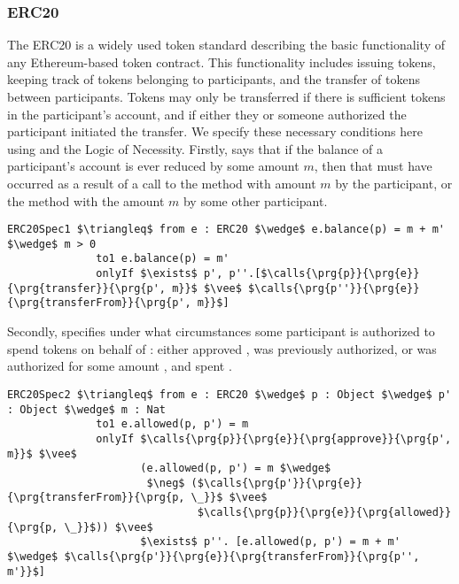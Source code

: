 \subsubsection{ERC20}
The ERC20 is a widely used token standard describing the basic functionality of any Ethereum-based token 
contract. This functionality includes issuing tokens, keeping track of tokens belonging to participants, and the 
transfer of tokens between participants. Tokens may only be transferred if there is sufficient tokens in the 
participant's account, and if either they or someone authorized the participant initiated the transfer. We 
specify these necessary conditions here using \Chainmail and the Logic of Necessity. Firstly,  
says that if the balance of a participant's account is ever reduced by some amount $m$, then
that must have occurred as a result of a call to the  method with amount $m$ by the participant,
or the  method with the amount $m$ by some other participant.
\begin{lstlisting}[language = Chainmail, mathescape=true, frame=lines]
ERC20Spec1 $\triangleq$ from e : ERC20 $\wedge$ e.balance(p) = m + m' $\wedge$ m > 0
              to1 e.balance(p) = m'
              onlyIf $\exists$ p', p''.[$\calls{\prg{p}}{\prg{e}}{\prg{transfer}}{\prg{p', m}}$ $\vee$ $\calls{\prg{p''}}{\prg{e}}{\prg{transferFrom}}{\prg{p', m}}$]
\end{lstlisting}
Secondly,  specifies under what circumstances some participant  is authorized to 
spend  tokens on behalf of : either  approved ,  was previously authorized,
or  was authorized for some amount , and spent .
\begin{lstlisting}[language = Chainmail, mathescape=true, frame=lines]
ERC20Spec2 $\triangleq$ from e : ERC20 $\wedge$ p : Object $\wedge$ p' : Object $\wedge$ m : Nat
              to1 e.allowed(p, p') = m
              onlyIf $\calls{\prg{p}}{\prg{e}}{\prg{approve}}{\prg{p', m}}$ $\vee$ 
                     (e.allowed(p, p') = m $\wedge$ 
                      $\neg$ ($\calls{\prg{p'}}{\prg{e}}{\prg{transferFrom}}{\prg{p, \_}}$ $\vee$ 
                              $\calls{\prg{p}}{\prg{e}}{\prg{allowed}}{\prg{p, \_}}$)) $\vee$
                     $\exists$ p''. [e.allowed(p, p') = m + m' $\wedge$ $\calls{\prg{p'}}{\prg{e}}{\prg{transferFrom}}{\prg{p'', m'}}$]
\end{lstlisting}

